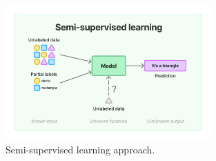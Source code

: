 \begin{description}
    \begin{figure}[H]
        \centering
        \includegraphics[width=0.7\textwidth, interpolate=false]{img/theoretical/semi-supervised.pdf}
        \caption{Semi-supervised learning approach.}
        \label{fig:semi-supervised-learning}
    \end{figure}


\end{description}
